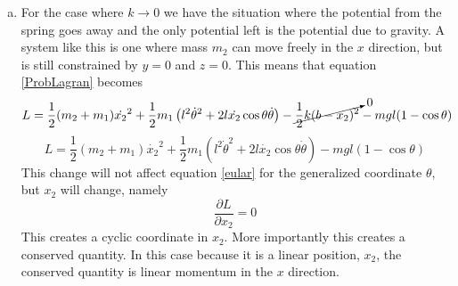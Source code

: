 \documentclass[11pt]{article}
\numberwithin{equation}{section}
\begin{document}
\begin{enumerate}[(a)]
\item
For the case where $k \rightarrow 0$ we have the situation where the potential from the spring goes away and the only potential left is the potential due to gravity. A system like this is one where mass $m_2$ can move freely in the $x$ direction, but is still constrained by $y=0$ and $z=0$. This means that equation \ref{ProbLagran} becomes
$$L = \frac{1}{2} (m_2 + m_1) \dot{x_2}^2 + \frac{1}{2} m_1 \left( l^2\dot{\theta}^2 + 2l\dot{x_2}\cos{\theta}\dot{\theta}\right) - \cancelto{0}{\frac{1}{2}k(b - x_2)^2} - mgl(1-\cos{\theta})$$
\begin{equation}
L = \frac{1}{2} (m_2 + m_1) \dot{x_2}^2 + \frac{1}{2} m_1 \left( l^2\dot{\theta}^2 + 2l\dot{x_2}\cos{\theta}\dot{\theta}\right) - mgl(1-\cos{\theta})
\label{PBLagran}
\end{equation}
This change will not affect equation \ref{eular} for the generalized coordinate $\theta$, but $x_2$ will change, namely 
$$\frac{\partial L}{\partial x_2} = 0$$
This creates a cyclic coordinate in $x_2$. More importantly this creates a conserved quantity. In this case because it is a linear position, $x_2$, the conserved quantity is linear momentum in the $x$ direction.

\end{enumerate}
\end{document}
